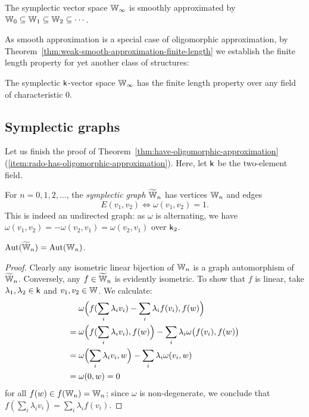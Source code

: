 \begin{theorem}\label{thm:symplectic-smooth-approximation}
    The symplectic vector space $\mathbb{W}_\infty$ is smoothly approximated by 
    $\mathbb{W}_0 \subseteq \mathbb{W}_1 \subseteq \mathbb{W}_2 \subseteq \cdots$.
\end{theorem}

As smooth approximation is a special case of oligomorphic approximation, 
by Theorem~\ref{thm:weak-smooth-approximation-finite-length} we establish the finite length property for yet another class of structures:
\begin{corollary}
    The symplectic $\mathsf{k}$-vector space $\mathbb{W}_\infty$ has the finite length property over any field of characteristic $0$.
\end{corollary}




\subsection{Symplectic graphs}
Let us finish the proof of Theorem~\ref{thm:have-oligomorphic-approximation}(\ref{item:rado-has-oligomorphic-approximation}).
Here, let $\mathsf{k}$ be the two-element field.
\begin{definition}
    For $n = 0, 1, 2, \ldots$, the \emph{symplectic graph} $\widetilde {\mathbb{W}}_n$ has vertices $\mathbb{W}_n$ and edges
    \[
        E(v_1, v_2) \iff \omega(v_1, v_2) = 1.
    \]
    This is indeed an undirected graph: as $\omega$ is alternating, we have $\omega(v_1, v_2) = -\omega(v_2, v_1) = \omega(v_2, v_1)$ over $\mathsf{k}_2$.
\end{definition}

\begin{proposition}\label{prop:symplectic-vs-graph}
    $\operatorname{Aut}(\widetilde {\mathbb{W}}_n) = \operatorname{Aut}(\mathbb{W}_n)$.
\end{proposition}
\begin{proof}
    Clearly any isometric linear bijection of $\mathbb{W}_n$ is a graph automorphism of $\widetilde {\mathbb{W}}_n$.
    Conversely, any $f \in \widetilde {\mathbb{W}}_n$ is evidently isometric.
    To show that $f$ is linear, take $\lambda_1, \lambda_2 \in \mathsf{k}$ and $v_1, v_2 \in \mathbb{W}$.
    We calculate:
    \begin{align*}
        &\omega\Bigl( f(\sum_i \lambda_i v_i) - \sum_i \lambda_i f(v_i) , f(w) \Bigr) \\
        ={}& \omega\Bigl( f(\sum_i \lambda_i v_i), f(w)\Bigr) - \sum_i \lambda_i \omega\bigl(f(v_i), f(w) \bigr) \\
        ={}& \omega\Bigl( \sum_i \lambda_i v_i, w \Bigr) - \sum_i \lambda_i \omega( v_i, w ) \\
        ={}& \omega(0, w) = 0
    \end{align*}
    for all $f(w) \in f(\mathbb{W}_n) = \mathbb{W}_n$;
    since $\omega$ is non-degenerate, 
    we conclude that $f(\sum_i \lambda_i v_i) = \sum_i \lambda_i f(v_i)$.
\end{proof}

